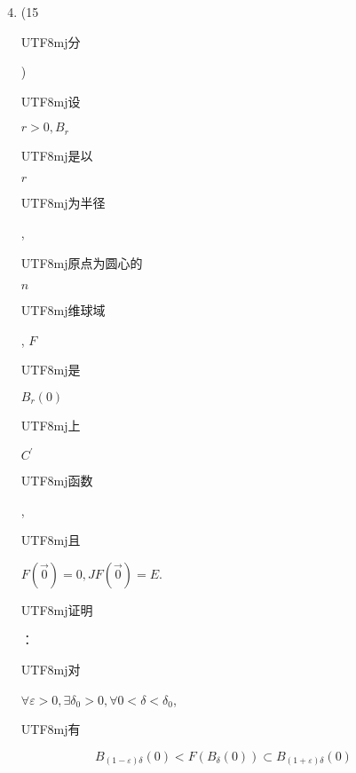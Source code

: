 \documentclass[10pt]{article}
\begin{document}
\begin{enumerate}
  \setcounter{enumi}{3}
  \item (15 \begin{CJK}{UTF8}{mj}分\end{CJK}) \begin{CJK}{UTF8}{mj}设\end{CJK} $r>0, B_{r}$ \begin{CJK}{UTF8}{mj}是以\end{CJK} $r$ \begin{CJK}{UTF8}{mj}为半径\end{CJK}, \begin{CJK}{UTF8}{mj}原点为圆心的\end{CJK} $n$ \begin{CJK}{UTF8}{mj}维球域\end{CJK}, $F$ \begin{CJK}{UTF8}{mj}是\end{CJK} $B_{r}(0)$ \begin{CJK}{UTF8}{mj}上\end{CJK} $C^{\prime}$ \begin{CJK}{UTF8}{mj}函数\end{CJK}, \begin{CJK}{UTF8}{mj}且\end{CJK} $F(\overrightarrow{0})=0, J F(\overrightarrow{0})=E$. \begin{CJK}{UTF8}{mj}证明\end{CJK}：\begin{CJK}{UTF8}{mj}对\end{CJK} $\forall \varepsilon>0, \exists \delta_{0}>0, \forall 0<\delta<\delta_{0}$, \begin{CJK}{UTF8}{mj}有\end{CJK}
\end{enumerate}
$$
B_{(1-\varepsilon) \delta}(0)<F\left(B_{\delta}(0)\right) \subset B_{(1+\varepsilon) \delta}(0)
$$
\end{document}

